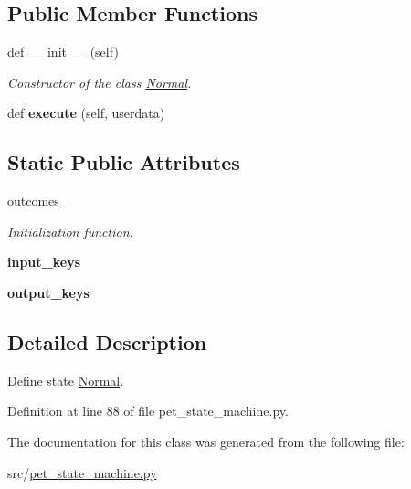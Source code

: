 \subsection*{Public Member Functions}
\begin{DoxyCompactItemize}
\item 
\mbox{\label{classpet__state__machine_1_1Normal_a6b7c484529c44b5f361734c6b843af44}} 
def \hyperlink{classpet__state__machine_1_1Normal_a6b7c484529c44b5f361734c6b843af44}{\+\_\+\+\_\+init\+\_\+\+\_\+} (self)
\begin{DoxyCompactList}\small\item\em Constructor of the class \hyperlink{classpet__state__machine_1_1Normal}{Normal}. \end{DoxyCompactList}\item 
\mbox{\label{classpet__state__machine_1_1Normal_a1344b06878a2bc90867fcfa24de15599}} 
def {\bfseries execute} (self, userdata)
\end{DoxyCompactItemize}
\subsection*{Static Public Attributes}
\begin{DoxyCompactItemize}
\item 
\mbox{\label{classpet__state__machine_1_1Normal_a9b1d4115879162f976c598c3f8c65455}} 
\hyperlink{classpet__state__machine_1_1Normal_a9b1d4115879162f976c598c3f8c65455}{outcomes}
\begin{DoxyCompactList}\small\item\em Initialization function. \end{DoxyCompactList}\item 
\mbox{\label{classpet__state__machine_1_1Normal_a736c344630100c06a8c0f5184872f1ac}} 
{\bfseries input\+\_\+keys}
\item 
\mbox{\label{classpet__state__machine_1_1Normal_a4cb2c3dc03f1b60b57fd63d4e193dc62}} 
{\bfseries output\+\_\+keys}
\end{DoxyCompactItemize}


\subsection{Detailed Description}
Define state \hyperlink{classpet__state__machine_1_1Normal}{Normal}. 

Definition at line 88 of file pet\+\_\+state\+\_\+machine.\+py.



The documentation for this class was generated from the following file\+:\begin{DoxyCompactItemize}
\item 
src/\hyperlink{pet__state__machine_8py}{pet\+\_\+state\+\_\+machine.\+py}\end{DoxyCompactItemize}
